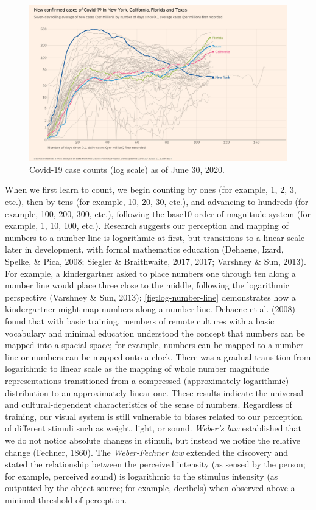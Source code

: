 \documentclass[print]{nuthesis}
\begin{document}
\begin{figure}[tbp]

{\centering \includegraphics[width=0.9\linewidth,]{images/covid19-FT-case-count-06.30.2020-log} 

}

\caption[Covid-19 case counts (log scale) as of June 30, 2020]{Covid-19 case counts (log scale) as of June 30, 2020.}\label{fig:covid19-FT-june2020-case-counts-log}
\end{figure}

When we first learn to count, we begin counting by ones (for example, 1, 2, 3, etc.), then by tens (for example, 10, 20, 30, etc.), and advancing to hundreds (for example, 100, 200, 300, etc.), following the base10 order of magnitude system (for example, 1, 10, 100, etc.).
Research suggests our perception and mapping of numbers to a number line is logarithmic at first, but transitions to a linear scale later in development, with formal mathematics education (Dehaene, Izard, Spelke, \& Pica, 2008; Siegler \& Braithwaite, 2017, 2017; Varshney \& Sun, 2013).
For example, a kindergartner asked to place numbers one through ten along a number line would place three close to the middle, following the logarithmic perspective (Varshney \& Sun, 2013); \cref{fig:log-number-line} demonstrates how a kindergartner might map numbers along a number line.
Dehaene et al. (2008) found that with basic training, members of remote cultures with a basic vocabulary and minimal education understood the concept that numbers can be mapped into a spacial space; for example, numbers can be mapped to a number line or numbers can be mapped onto a clock.
There was a gradual transition from logarithmic to linear scale as the mapping of whole number magnitude representations transitioned from a compressed (approximately logarithmic) distribution to an approximately linear one.
These results indicate the universal and cultural-dependent characteristics of the sense of numbers.
Regardless of training, our visual system is still vulnerable to biases related to our perception of different stimuli such as weight, light, or sound.
\emph{Weber's law} established that we do not notice absolute changes in stimuli, but instead we notice the relative change (Fechner, 1860).
The \emph{Weber-Fechner law} extended the discovery and stated the relationship between the perceived intensity (as sensed by the person; for example, perceived sound) is logarithmic to the stimulus intensity (as outputted by the object source; for example, decibels) when observed above a minimal threshold of perception.
\end{document}
